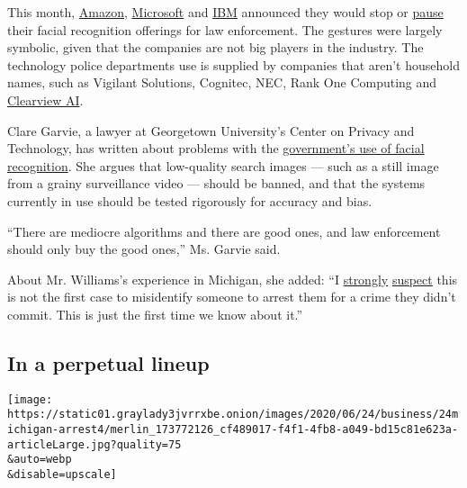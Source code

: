 This month,
\href{https://www.nytimes3xbfgragh.onion/2020/06/10/technology/amazon-facial-recognition-backlash.html}{Amazon},
\href{https://www.cnn.com/2020/06/18/tech/brad-smith-microsoft-facial-recognition/index.html}{Microsoft}
and
\href{https://www.axios.com/ibm-is-exiting-the-face-recognition-business-62e79f09-34a2-4f1d-a541-caba112415c6.html}{IBM}
announced they would stop or
\href{https://www.nytimes3xbfgragh.onion/aponline/2020/06/11/business/bc-us-microsoft-police-facial-recognition.html}{pause}
their facial recognition offerings for law enforcement. The gestures
were largely symbolic, given that the companies are not big players in
the industry. The technology police departments use is supplied by
companies that aren't household names, such as Vigilant Solutions,
Cognitec, NEC, Rank One Computing and
\href{https://www.nytimes3xbfgragh.onion/2020/01/18/technology/clearview-privacy-facial-recognition.html}{Clearview
AI}.

Clare Garvie, a lawyer at Georgetown University's Center on Privacy and
Technology, has written about problems with the
\href{https://www.flawedfacedata.com/}{government's use of facial
recognition}. She argues that low-quality search images --- such as a
still image from a grainy surveillance video --- should be banned, and
that the systems currently in use should be tested rigorously for
accuracy and bias.

``There are mediocre algorithms and there are good ones, and law
enforcement should only buy the good ones,'' Ms. Garvie said.

About Mr. Williams's experience in Michigan, she added: ``I
\href{https://www.aclu.org/blog/privacy-technology/surveillance-technologies/florida-using-facial-recognition-convict-people}{strongly}
\href{https://nymag.com/intelligencer/2019/11/the-future-of-facial-recognition-in-america.html}{suspect}
this is not the first case to misidentify someone to arrest them for a
crime they didn't commit. This is just the first time we know about
it.''

\hypertarget{in-a-perpetual-lineup}{%
\subsection{In a perpetual lineup}\label{in-a-perpetual-lineup}}

\texttt{[image: https://static01.graylady3jvrrxbe.onion/images/2020/06/24/business/24michigan-arrest4/merlin\_173772126\_cf489017-f4f1-4fb8-a049-bd15c81e623a-articleLarge.jpg?quality=75\\\&auto=webp\\\&disable=upscale]}

